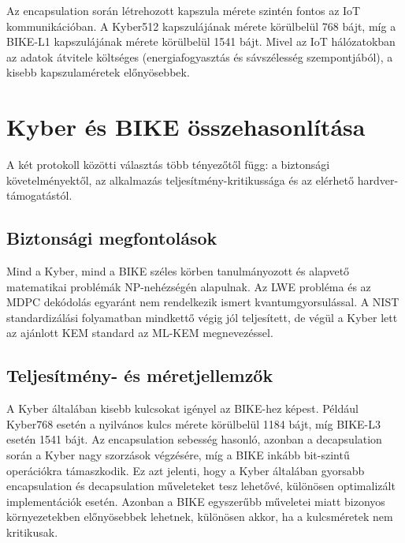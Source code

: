 Az encapsulation során létrehozott kapszula mérete szintén fontos 
az IoT kommunikációban. A Kyber512 kapszulájának mérete körülbelül 
768 bájt, míg a BIKE-L1 kapszulájának mérete körülbelül 1541 bájt. 
Mivel az IoT hálózatokban az adatok átvitele költséges (energiafogyasztás 
és sávszélesség szempontjából), a kisebb kapszulaméretek előnyösebbek.


\section{Kyber és BIKE összehasonlítása}


A két protokoll közötti választás több tényezőtől függ: a biztonsági követelményektől, 
az alkalmazás teljesítmény-kritikussága és az elérhető hardver-támogatástól.

\subsection{Biztonsági megfontolások}

Mind a Kyber, mind a BIKE széles körben tanulmányozott és alapvető matematikai 
problémák NP-nehézségén alapulnak. Az LWE probléma és az MDPC dekódolás egyaránt 
nem rendelkezik ismert kvantumgyorsulással. A NIST standardizálási folyamatban mindkettő végig 
jól teljesített, de végül a Kyber lett az ajánlott KEM standard az ML-KEM 
megnevezéssel.

\subsection{Teljesítmény- és méretjellemzők}

A Kyber általában kisebb kulcsokat igényel az BIKE-hez képest. Például Kyber768 
esetén a nyilvános kulcs mérete körülbelül 1184 bájt, míg BIKE-L3 esetén 1541 bájt. 
Az encapsulation sebesség hasonló, azonban a decapsulation során a Kyber 
nagy szorzások végzésére, míg a BIKE inkább bit-szintű operációkra támaszkodik. Ez azt jelenti, hogy a Kyber általában gyorsabb encapsulation és decapsulation műveleteket 
tesz lehetővé, különösen optimalizált implementációk esetén. Azonban a BIKE egyszerűbb műveletei miatt bizonyos környezetekben előnyösebbek lehetnek, különösen akkor, ha a kulcsméretek nem kritikusak.

